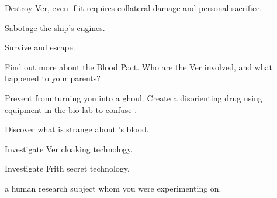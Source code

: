\documentclass[char]{guildcamp4}
\begin{document}
\begin{itemz}[Goals]
	\item Destroy Ver, even if it requires collateral damage and personal sacrifice.
	\item Sabotage the ship's engines.
	\item Survive and escape.
	\item Find out more about the Blood Pact. Who are the Ver involved, and what happened to your parents?
	\item Prevent \cVone{} from turning you into a ghoul. Create a disorienting drug using equipment in the bio lab to confuse .
	\item Discover what is strange about \cPlead{}'s blood.
	\item Investigate Ver cloaking technology.
	\item Investigate Frith secret technology.
\end{itemz}

\begin{contacts}
	\contact{\cPlead{}} a human research subject whom you were experimenting on. 
\end{contacts}
\end{document}
